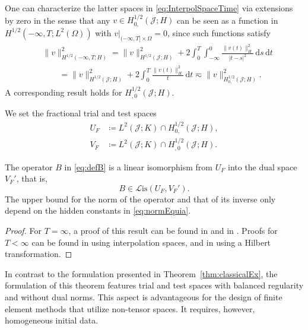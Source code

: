 \documentclass{amsart}
\providecommand{\dt}{\,\mathrm{d}t}
\providecommand{\ds}{\,\mathrm{d}s}
\newcommand{\cL}{\mathcal L}
\newcommand{\Lis}{\cL\mathrm{is}}
\begin{document}
\begin{remark}\label{rem:ExtByZero}
One can characterize the latter spaces in \eqref{eq:InterpolSpaceTime} via extensions by zero in the sense that any $v\in H^{1/2}_{0,}(\mathcal{J};H)$ can be seen as a function in $H^{1/2}(-\infty,T;L^2(\Omega))$ with $v|_{(-\infty,T]\times \Omega} = 0$, since such functions satisfy
\begin{equation}\label{eq:HalfSpaceToLocal}
\begin{aligned}
&\lVert v \rVert_{H^{1/2}(-\infty,T;H)}^2 = \lVert v \rVert_{H^{1/2}(\mathcal{J};H)}^2 + 2 \int_0^T \int_{-\infty}^0 \frac{\lVert v(t)\rVert_H^2}{|t-s|^2} \ds \dt \\
&\qquad = \lVert v \rVert_{H^{1/2}(\mathcal{J};H)}^2 + 2 \int_0^T \frac{\lVert v(t)\rVert_H^2}{t} \dt 
\eqsim \lVert v \rVert_{H^{1/2}_{0,}(\mathcal{J};H)}^2.
\end{aligned}
\end{equation}
A corresponding result holds for $H^{1/2}_{,0}(\mathcal{J};H)$.
\end{remark}
%
We set the fractional trial and test spaces
\begin{equation}\label{eq:DefUvV}
\begin{aligned}
U_F& \coloneqq L^2(\mathcal{J};K) \cap H^{1/2}_{0,}(\mathcal{J};H),\\ 
V_F& \coloneqq L^2(\mathcal{J};K) \cap H^{1/2}_{,0}(\mathcal{J};H).
\end{aligned}
\end{equation}
%
\begin{theorem}\label{thm:fractEx}
The operator $B$ in \eqref{eq:defB} is a linear isomorphism from $U_F$ into the dual space $V_F'$, that is, 
\begin{equation*}
B \in \Lis(U_F,V_F').
\end{equation*} 
The upper bound for the norm of the operator and that of its inverse only depend on the hidden constants in \eqref{eq:normEquia}. 
\end{theorem}
\begin{proof}
For $T=\infty$, a proof of this result can be found in \cite[Thm.~2.2]{BaiocchiBrezzi83} and in \cite[Thm.~4.3]{Fontes09}.
Proofs for $T<\infty$ can be found in \cite[Cor.~3.9]{SchwabStevenson17} using interpolation spaces, and in \cite[Thm.~3.2]{SteinbachZank20} using a Hilbert transformation.
\end{proof}
In contrast to the formulation presented in Theorem~\ref{thm:classicalEx}, the formulation of this theorem features trial and test spaces with balanced regularity and without dual norms. This aspect is advantageous for the design of finite element methods that utilize non-tensor spaces. 
It requires, however, homogeneous initial data.
%
\end{document}
